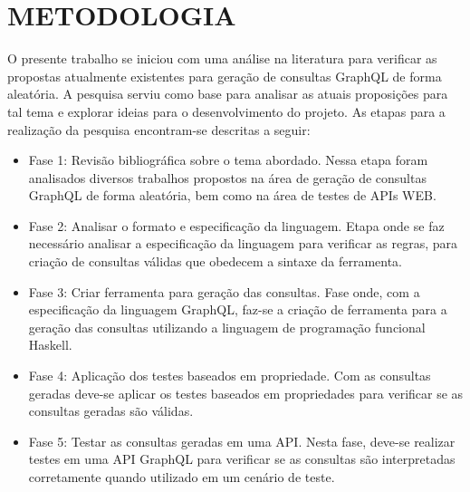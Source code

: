 \chapter{METODOLOGIA}
\label{chap:metodologia}
O presente trabalho se iniciou com uma análise na literatura para verificar as propostas atualmente existentes para geração de consultas GraphQL de forma aleatória. A pesquisa serviu como base para analisar as atuais proposições para tal tema e explorar ideias para o desenvolvimento do projeto. As etapas para a realização da pesquisa encontram-se descritas a seguir:

\begin{itemize}
\item Fase 1: Revisão bibliográfica sobre o tema abordado. Nessa etapa foram analisados diversos trabalhos propostos na área de geração de consultas GraphQL de forma aleatória, bem como na área de testes de APIs WEB.
\item Fase 2: Analisar o formato e especificação da linguagem. Etapa onde se faz necessário analisar a especificação da linguagem para verificar as regras, para criação de consultas válidas que obedecem a sintaxe da ferramenta.
\item Fase 3: Criar ferramenta para geração das consultas. Fase onde, com a especificação da linguagem GraphQL, faz-se a criação de ferramenta para a geração das consultas utilizando a linguagem de programação funcional Haskell.
\item Fase 4: Aplicação dos testes baseados em propriedade. Com as consultas geradas deve-se aplicar os testes baseados em propriedades para verificar se as consultas geradas são válidas.
\item Fase 5: Testar as consultas geradas em uma API. Nesta fase, deve-se realizar testes em uma API GraphQL para verificar se as consultas são interpretadas corretamente quando utilizado em um cenário de teste.
\end{itemize}
